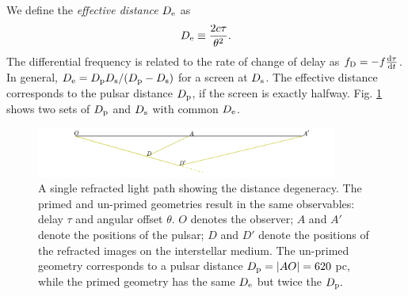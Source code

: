 \documentclass[useAMS,usenatbib]{mn2e}
\begin{document}

We define the {\it effective distance} $D_{\rm e}$ as
\begin{equation}
D_{\rm e} \equiv \frac{2c\tau}{\theta^2}.
\end{equation}
The differential frequency is related to the rate of change of delay
as $f_{\rm D}  =-f\frac{\rm d\tau}{\operatorname{d \!} t}$.    
In general, $D_{\rm e}={D_{\rm p} D_{\rm s}}/({D_{\rm p} - D_{\rm
    s}})$ for a screen at $D_{\rm s}$.  
    The effective distance
corresponds to the pulsar distance $D_{\rm p}$, if the screen is exactly halfway.  
Fig. \ref{fig:Singledegeneracy} shows two sets of $D_{\rm p}$ and $D_{\rm s}$ with common $D_{\rm e}$.

\begin{figure}
\centering
\hspace*{-0.4in}\includegraphics[width=3.9in]{single_degeneracy_Nov25.pdf}
\caption{A single refracted light path showing the distance
  degeneracy.  The primed and un-primed geometries result in the same
  observables: delay $\tau$ and angular offset $\theta$.
$O$ denotes the observer; $A$ and $A'$ denote the positions of the
pulsar; $D$ and $D'$ denote the positions of the refracted images on the
interstellar medium. The un-primed geometry corresponds to a pulsar
distance $D_{\rm p} = |AO| = 620$ pc, while the primed geometry has the same $D_{\rm e}$ but twice the
$D_{\rm p}.$}
\label{fig:Singledegeneracy}
\end{figure}


\end{document}
